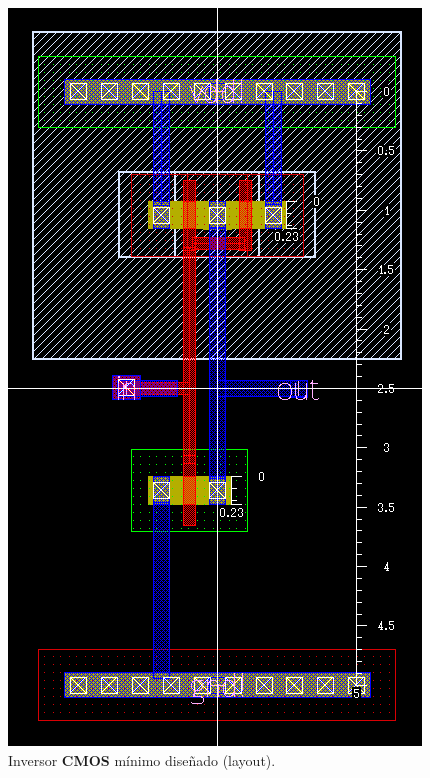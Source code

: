 \begin{figure}[H] %
\begin{center}
\includegraphics[width=0.45 \textwidth, angle=0]{./img/point3/TEST_LOGIC_GATES_Inverter_load_layout}
\caption{\label{fig:fig_inverter_load_layout}\footnotesize{Inversor \textbf{CMOS} mínimo diseñado (layout).}}
\end{center}
\end{figure}

\vfill
\clearpage